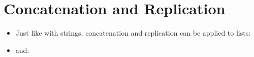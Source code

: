 \documentclass[letterpaper,10pt,english]{sphinxmanual}
\begin{document}
\section{Concatenation and Replication}
\label{\detokenize{lecture_notes/lec10_lists2:concatenation-and-replication}}\begin{itemize}
\item {} 
Just like with strings, concatenation and replication can be
applied to lists:

\begin{sphinxVerbatim}[commandchars=\\\{\}]
  \PYG{p}{[}  \PYG{p}{]}  \PYG{p}{[} \PYG{p}{]}
\end{sphinxVerbatim}

\item {} 
and:

\begin{sphinxVerbatim}[commandchars=\\\{\}]
\PYG{p}{[}\PYG{p}{]}  
\end{sphinxVerbatim}

\end{itemize}
\end{document}
